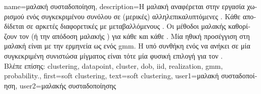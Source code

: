 {name={\foreignlanguage{greek}{μαλακή συσταδοποίηση}}, 
	description={\foreignlanguage{greek}{Η μαλακή}  
		\foreignlanguage{greek}{αναφέρεται στην εργασία χωρισμού ενός συγκεκριμένου συνόλου}  
		\foreignlanguage{greek}{σε (μερικές) αλληλεπικαλυπτόμενες} . 
		\foreignlanguage{greek}{Κάθε}  \foreignlanguage{greek}{αποδίδεται σε αρκετές διαφορετικές} 
		 \foreignlanguage{greek}{με μεταβαλλόμενους} . \foreignlanguage{greek}{Οι 
		μέθοδοι μαλακής}  \foreignlanguage{greek}{καθορίζουν τον}
		 (\foreignlanguage{greek}{ή την απόδοση μαλακής} ) \foreignlanguage{greek}{για 
		κάθε}  \foreignlanguage{greek}{και κάθε} .
		\foreignlanguage{greek}{Μία ηθική προσέγγιση στη μαλακή}  \foreignlanguage{greek}{είναι 
		με την ερμηνεία}  \foreignlanguage{greek}{ως}   
		\foreignlanguage{greek}{ενός} \gls{gmm}. \foreignlanguage{greek}{Η υπό συνθήκη}  
		\foreignlanguage{greek}{ενός}  \foreignlanguage{greek}{να ανήκει σε μία συγκεκριμένη συνιστώσα 
		μίγματος είναι τότε μία φυσική επιλογή για τον} . \\
		\foreignlanguage{greek}{Βλέπε επίσης:} \gls{clustering}, \gls{datapoint}, \gls{cluster}, \gls{dob}, \gls{iid}, \gls{realization}, \gls{gmm}, \gls{probability}.},
	first={soft clustering},
	text={soft clustering},
	user1={\foreignlanguage{greek}{μαλακή συσταδοποίηση}}, %
	user2={\foreignlanguage{greek}{μαλακής συσταδοποίησης}} %
}

